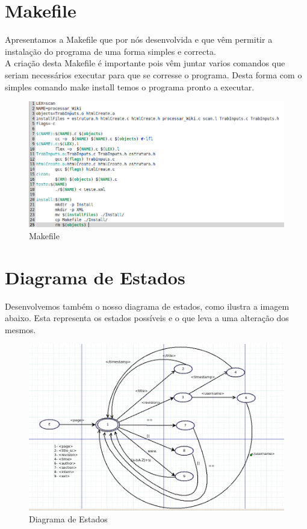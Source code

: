 \documentclass[a4paper,11pt,openright,openbib]{report}
\begin{document}
\section{Makefile}

Apresentamos a Makefile que por nós desenvolvida e que vêm permitir a instalação do programa de uma forma simples e correcta.\\
A criação desta Makefile é importante pois vêm juntar varios comandos que seriam necessários executar para que se corresse o programa. Desta forma com o simples comando make install temos o programa pronto a executar.\\ 


\begin{figure}[!htb]
     \centering
     \includegraphics[scale=0.42]{imagens/makefile.png}
	\caption{Makefile}
\end{figure}  
\section{Diagrama de Estados}
Desenvolvemos também o nosso diagrama de estados, como ilustra a imagem abaixo. Esta representa os estados possíveis e o que leva a uma alteração dos mesmos.\\



\begin{figure}[!htb]
    \centering
    \includegraphics[scale=0.5]{imagens/diagrama.png}
	\caption{Diagrama de Estados}
\end{figure}  
\end{document}
